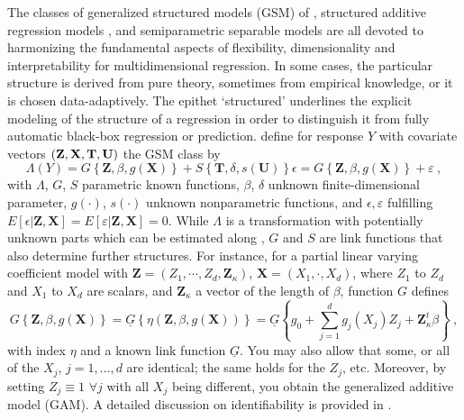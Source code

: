 The classes of generalized structured models (GSM) of \cite{MN2003}, structured additive regression models \citep{BKL2005}, and semiparametric separable models \citep{RSV2003} are all devoted to harmonizing the fundamental aspects of flexibility, dimensionality and
interpretability \cite[c.f.\ also][]{S1986} for multidimensional regression. In some cases, the particular structure is derived 
from pure theory, sometimes from empirical knowledge, or it is chosen data-adaptively. 
The epithet `structured' underlines the explicit modeling of the structure of a regression 
in order to distinguish it from fully automatic black-box regression or prediction. 
\cite{MN2003} define for response $Y$ with covariate vectors $({\bf Z,X,T,U})$  the GSM class by 
\begin{equation}\label{GSM}
	\Lambda ( Y ) =  G\left\{ {\mathbf Z}, \beta , g({\mathbf X}) \right\} +S\left\{ {\mathbf T},\delta ,s ({\mathbf U})\right\} \epsilon = G\left\{ {\mathbf Z}, \beta , g({\mathbf X}) \right\} +\varepsilon \ ,
\end{equation}
with $\Lambda$, $G$, $S$ parametric known functions, $\beta $, $\delta $ unknown 
finite-dimensional parameter, $g (\cdot )$, $s (\cdot)$ unknown nonparametric functions, and $\epsilon, \varepsilon$ fulfilling \( E[\epsilon | {\mathbf Z},{\mathbf X} ]=E[\varepsilon | {\mathbf Z},{\mathbf X} ]=0 \). While $\Lambda$ is a transformation with potentially unknown parts which can be estimated along \cite{LSVK2008}, $G$ and $S$ are link functions that also determine further structures. For instance, for a partial linear varying coefficient model \citep{PMLL2015} with ${\mathbf Z}=(Z_1,\cdots ,Z_d,{\mathbf Z}_\kappa)$, ${\mathbf X}=(X_1,\cdot ,X_d)$, where $Z_1$ to $Z_d$ and $X_1$ to $X_d$ are scalars, and ${\mathbf Z}_\kappa$ a vector of the length of $\beta$, function $G$ defines 
\begin{equation}\label{VCM}
	G\left\{ {\mathbf Z}, \beta , g ({\mathbf X}) \right\} = 
	\underline{G}\left\{ \eta ({\mathbf Z},\beta , g({\mathbf X})) \right\} = \underline{G}\left\{ g_0+\sum_{j=1}^{d}
	g_j(X_j )Z_{j} + {\mathbf Z}_\kappa^t\beta \right\} \ ,
\end{equation}
with index $\eta$ and a known link function $\underline{G}$.
You may also allow that some, or all of the $X_j$, $j=1,\ldots ,d$ are identical; 
the same holds for the $Z_j$, etc. Moreover, by setting $Z_j\equiv 1$ $\forall j$ 
with all $X_j$ being different, you obtain the generalized additive model (GAM).
A detailed discussion on identifiability is provided in \cite{LMP2012}.

